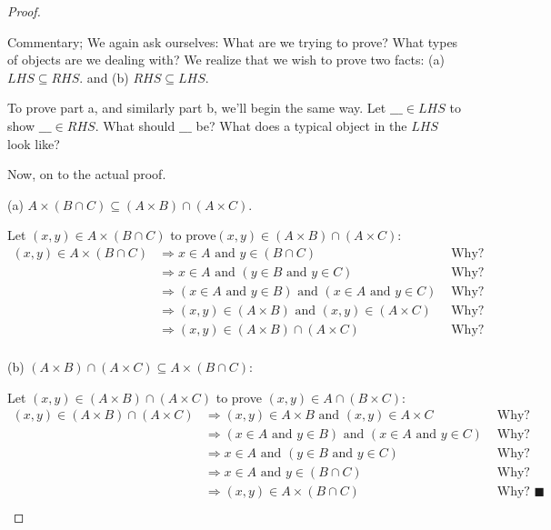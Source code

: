 \documentclass[10pt,]{book}
\theoremstyle{plain}
\theoremstyle{definition}
\theoremstyle{definition}
\theoremstyle{definition}
\begin{document}
\begin{proof}\hypertarget{proof-2}{}
Commentary; We again ask ourselves: What are we trying to prove? What types of objects are we dealing with? We realize that we wish to prove two facts: (a) \(LHS\subseteq RHS\). and (b) \(RHS\subseteq LHS\).%
\par
To prove part a, and similarly part b, we'll begin the same way. Let  \(\_\_\_ \in  LHS\) to show \(\_\_\_ \in  RHS\). What should \(\_\_\_\) be?  What does a typical object in the \(LHS\) look like?%
\par
Now, on to the actual proof.%
\par
(a) \(A\times (B\cap  C)\subseteq (A\times B)\cap (A\times C)\).%
\par
Let \((x, y) \in  A\times (B\cap C)\) to prove\((x, y) \in  (A\times B)\cap (A\times C)\):
\begin{equation*}
\begin{split}
(x, y) \in A\times (B\cap C) &\Rightarrow x \in  A \textrm{ and } y \in  (B\cap  C)&\textrm{ Why? }\\
	&\Rightarrow x \in  A \textrm{ and }(y \in  B\textrm{ and } y \in  C)&\textrm{ Why? }\\
	 &\Rightarrow (x \in  A \textrm{ and } y \in  B) \textrm{ and } (x \in  A \textrm{ and } y \in C)&\textrm{ Why? }\\
	  &\Rightarrow  (x, y) \in  (A\times B) \textrm{ and } (x, y) \in  (A \times C)&\textrm{ Why? }\\
	   &\Rightarrow (x, y) \in  (A\times  B) \cap (A\times C)&\textrm{ Why? }\\
 \end{split}
 \end{equation*}
%
\par
(b) \((A\times  B)\cap (A\times C)\subseteq A\times ( B\cap C)\):

Let \((x, y) \in  (A\times  B) \cap  (A\times C)\) to prove \((x, y) \in  A \cap  ( B\times C)\):
\begin{equation*}
\begin{split}
(x, y) \in  (A\times  B)\cap (A\times C) &\Rightarrow (x, y) \in  A\times  B\textrm{ and } (x, y) \in  A\times C&\textrm{ Why? }\\
 &\Rightarrow (x \in  A \textrm{ and } y \in  B) \textrm{ and } (x \in  A \textrm{ and } y \in  C)&\textrm{ Why? }\\
  &\Rightarrow  x \in  A \textrm{ and } (y \in  B\textrm{ and } y \in  C)&\textrm{ Why? }\\
  &\Rightarrow  x \in  A\textrm{ and } y \in  (B\cap  C)&\textrm{ Why? }\\
   &\Rightarrow (x, y) \in  A \times (B\cap  C)&\textrm{ Why? }  \blacksquare\\
 \end{split}
 \end{equation*}
%
\end{proof}
\typeout{************************************************}
\typeout{************************************************}
\end{document}
